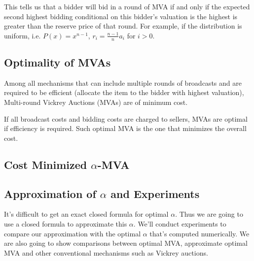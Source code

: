 This tells us that a bidder will bid in a round of MVA if and only if the
expected second highest bidding conditional on this bidder's valuation is the
highest is greater than the reserve price of that round. For example, if the
distribution is uniform, i.e. $P(x) = x^{n-1}$, $r_i = \frac{n-1}{n} a_i$ for
$i > 0$.

\subsection{Optimality of MVAs}

\begin{theorem}\label{theorem1}

Among all mechanisms that can include multiple rounds of broadcasts and are
required to be efficient (allocate the item to the bidder with highest
valuation), Multi-round Vickrey Auctions (MVAs) are of minimum cost.

\end{theorem}


\begin{corollary}

If all broadcast costs and bidding costs are charged to sellers, MVAs are
optimal if efficiency is required.  Such optimal MVA is the one that minimizes
the overall cost.

\end{corollary}

\subsection{Cost Minimized $\alpha$-MVA}

\subsection{Approximation of $\alpha$ and Experiments}

It's difficult to get an exact closed formula for optimal $\alpha$. Thus we are
going to use a closed formula to approximate this $\alpha$. We'll conduct
experiments to compare our approximation with the optimal $\alpha$ that's
computed numerically. We are also going to show comparisons between optimal
MVA, approximate optimal MVA and other conventional mechanisms such as Vickrey
auctions.


